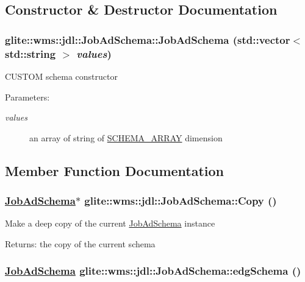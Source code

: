 \subsection{Constructor \& Destructor Documentation}
\hypertarget{classglite_1_1wms_1_1jdl_1_1JobAdSchema_a0}{
\subsubsection[JobAdSchema]{\setlength{\rightskip}{0pt plus 5cm}glite::wms::jdl::Job\-Ad\-Schema::Job\-Ad\-Schema (std::vector$<$ std::string $>$ {\em values})}}
\label{classglite_1_1wms_1_1jdl_1_1JobAdSchema_a0}


CUSTOM schema constructor \begin{Desc}
\item[Parameters:]
\begin{description}
\item[{\em values}]an array of string of \hyperlink{classglite_1_1wms_1_1jdl_1_1JobAdSchema_w6w5}{SCHEMA\_\-ARRAY} dimension \end{description}
\end{Desc}


\subsection{Member Function Documentation}
\hypertarget{classglite_1_1wms_1_1jdl_1_1JobAdSchema_a2}{
\subsubsection[Copy]{\setlength{\rightskip}{0pt plus 5cm}\hyperlink{classglite_1_1wms_1_1jdl_1_1JobAdSchema}{Job\-Ad\-Schema}$\ast$ glite::wms::jdl::Job\-Ad\-Schema::Copy ()}}
\label{classglite_1_1wms_1_1jdl_1_1JobAdSchema_a2}


Make a deep copy of the current \hyperlink{classglite_1_1wms_1_1jdl_1_1JobAdSchema}{Job\-Ad\-Schema} instance \begin{Desc}
\item[Returns:]the copy of the current schema \end{Desc}
\hypertarget{classglite_1_1wms_1_1jdl_1_1JobAdSchema_e1}{
\subsubsection[edgSchema]{\setlength{\rightskip}{0pt plus 5cm}\hyperlink{classglite_1_1wms_1_1jdl_1_1JobAdSchema}{Job\-Ad\-Schema} glite::wms::jdl::Job\-Ad\-Schema::edg\-Schema ()}}
\label{classglite_1_1wms_1_1jdl_1_1JobAdSchema_e1}


